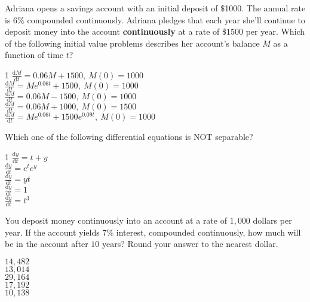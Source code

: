 \documentclass[12pt]{amsart}
\def\D{\mathrm{d}}
\begin{document}
\begin{exam}
\begin{problem}
Adriana opens a savings account with an initial deposit of $\$$1000.
The annual rate is 6$\%$ compounded continuously. Adriana pledges that
each year she'll continue to deposit money into the account 
{\bf continuously} at a rate
of  $\$1500$ per year. Which of the following initial value problems describes
her account's balance $M$ as a function of time $t$?
%
\begin{answers}1
$\frac{\D M}{\D t} = 0.06M+1500,\ M(0)=1000$ \\
$\frac{\D M}{\D t}=Me^{0.06t}+ 1500,\ M(0) =1000$ \\
$\frac{\D M}{\D t} = 0.06M-1500,\ M(0)=1000$ \\
$\frac{\D M}{\D t} = 0.06M+1000,\ M(0)=1500$ \\
$\frac{\D M}{\D t}=Me^{0.06t}+1500 e^{0.09t},\ M(0)=1000$ \\
\end{answers}
\end{problem}





\begin{problem}
Which one of the following differential equations is NOT separable?
%
\begin{answers}1
$\frac{\D y}{\D t}=t+y$ \\
$\frac{\D y}{\D t}=e^t e^y$ \\
$\frac{\D y}{\D t}=y t$ \\
$\frac{\D y}{\D t}=1$ \\
$\frac{\D y}{\D t}=t^3$ \\
\end{answers}
\end{problem}





\begin{problem}
You deposit money continuously into an account at a rate of $1,000$ dollars per
year. If the account yields $7\%$ interest, compounded continuously, how much
will be in the account after $10$ years? Round your answer to the nearest
dollar. 
%
\begin{answers}{1}
$14,482$\\  
$13,014$\\  
$29,164$\\ 
$17,192$\\
$10,138$ \\
\end{answers}


\end{problem}
\end{exam}
\end{document}
